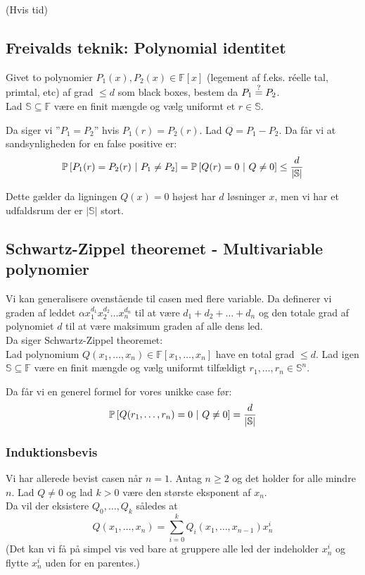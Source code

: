 \newpage
(Hvis tid)
\subsection{Freivalds teknik: Polynomial identitet}
Givet to polynomier $P_1(x), P_2(x) \in \mathbb F[x]$ (legement af f.eks. réelle tal, primtal, etc) af grad $\leq d$ som black boxes, bestem da $P_1 \stackrel{?}{=} P_2$.\\

Lad $\mathbb S \subseteq \mathbb F$ være en finit mængde og vælg uniformt et $r \in \mathbb S$.

Da siger vi ''$P_1 = P_2$'' hvis $P_1(r) = P_2(r)$. Lad $Q = P_1 - P_2$. Da får vi at sandsynligheden for en false positive er:
$$
  \P{P_1(r) = P_2(r) \ | P_1 \neq P_2} = \P{Q(r) = 0 \ | Q \neq 0} \leq \frac{d}{|\mathbb S|}
$$

Dette gælder da ligningen $Q(x) = 0$ højest har $d$ løsninger $x$, men vi har et udfaldsrum der er $|\mathbb{S}|$ stort.

\subsection{Schwartz-Zippel theoremet - Multivariable polynomier}
Vi kan generalisere ovenstående til casen med flere variable. Da definerer vi graden af leddet $\alpha x_1^{d_1} x_2^{d_2} \dots x_n^{d_n}$ til at være $d_1 + d_2 + \dots + d_n$ og den totale grad af polynomiet $d$ til at være maksimum graden af alle dens led.\\

Da siger Schwartz-Zippel theoremet:\\
Lad polynomium $Q(x_1, \dots, x_n) \in \mathbb F[x_1, \dots, x_n]$ have en total grad $\leq d$. Lad igen $\mathbb S \subseteq \mathbb F$ være en finit mængde og vælg uniformt tilfældigt $r_1, \dots, r_n \in \mathbb S^n$.

Da får vi en generel formel for vores unikke case før:
$$
  \P{Q(r_1, \dots, r_n) = 0 \ | Q \neq 0} = \frac{d}{|\mathbb S|}
$$


\subsubsection{Induktionsbevis}
Vi har allerede bevist casen når $n = 1$. Antag $n \geq 2$ og det holder for alle mindre $n$. Lad $Q \neq 0$ og lad $k > 0$ være den største eksponent af $x_n$.\\

Da vil der eksistere $Q_0, \dots, Q_k$ således at
$$
  Q(x_1, \dots, x_n) = \sum_{i=0}^k Q_i (x_1, \dots, x_{n-1}) x_n^i
$$
(Det kan vi få på simpel vis ved bare at gruppere alle led der indeholder $x_n^i$ og flytte $x_n^i$ uden for en parentes.)

